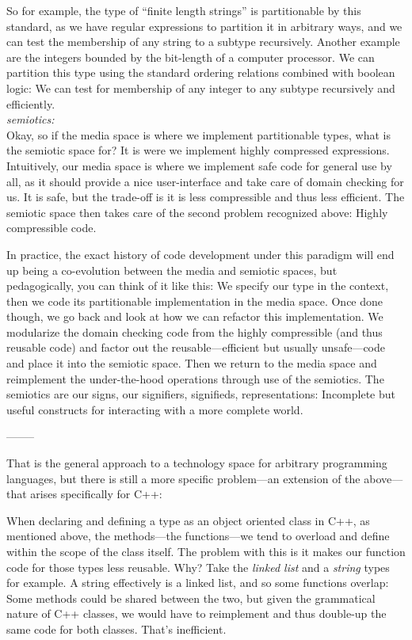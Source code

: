 \documentclass[twoside]{article}
\begin{document}
So for example, the type of ``finite length strings'' is partitionable by this standard, as we have regular expressions
to partition it in arbitrary ways, and we can test the membership of any string to a subtype recursively. Another example
are the integers bounded by the bit-length of a computer processor. We can partition this type using the standard ordering
relations combined with boolean logic: We can test for membership of any integer to any subtype recursively and efficiently.\\[0.1cm]

\emph{semiotics:}\\[0.1cm]

Okay, so if the media space is where we implement partitionable types, what is the semiotic space for? It is were we implement
highly compressed expressions. Intuitively, our media space is where we implement safe code for general use by all, as it
should provide a nice user-interface and take care of domain checking for us. It is safe, but the trade-off is it is less
compressible and thus less efficient. The semiotic space then takes care of the second problem recognized above:
Highly compressible code.

In practice, the exact history of code development under this paradigm will end up being a co-evolution between the media
and semiotic spaces, but pedagogically, you can think of it like this: We specify our type in the context, then we code
its partitionable implementation in the media space. Once done though, we go back and look at how we can refactor this
implementation.  We modularize the domain checking code from the highly compressible (and thus reusable code) and factor
out the reusable---efficient but usually unsafe---code and place it into the semiotic space. Then we return to the media space
and reimplement the under-the-hood operations through use of the semiotics. The semiotics are our signs, our signifiers,
signifieds, representations: Incomplete but useful constructs for interacting with a more complete world.

--------

That is the general approach to a technology space for arbitrary programming languages, but there is still a more
specific problem---an extension of the above---that arises specifically for C++:

When declaring and defining a type as an object oriented class in C++, as mentioned above, the
methods---the functions---we tend to overload and define within the scope of the class itself. The problem with
this is it makes our function code for those types less reusable. Why? Take the \emph{linked list} and a \emph{string}
types for example. A string effectively is a linked list, and so some functions overlap: Some methods could be
shared between the two, but given the grammatical nature of C++ classes, we would have to reimplement and thus double-up
the same code for both classes. That's inefficient.
\end{document}
